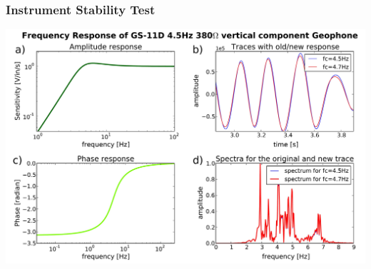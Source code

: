 \documentclass[compress=false,usepdftitle=false, subsection=false,xcolor=dvipsnames]{beamer}
\begin{document}
\begin{frame}[noframenumbering]
	\frametitle{Instrument Stability Test}
	\begin{center}
		\includegraphics[width=.85\linewidth]{Figures/freq_resp2.JPEG}
    \end{center}
\end{frame}
%
\end{document}
